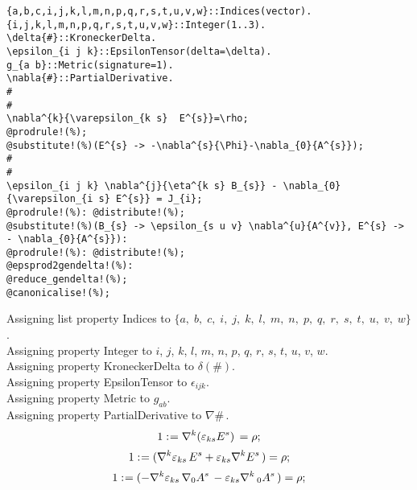 \documentclass[11pt]{article}
\def\specialcolon{\mathrel{\mathop{:}}\hspace{-.5em}}
\begin{document}
{\color[named]{Blue}\begin{verbatim}
{a,b,c,i,j,k,l,m,n,p,q,r,s,t,u,v,w}::Indices(vector).
{i,j,k,l,m,n,p,q,r,s,t,u,v,w}::Integer(1..3).
\delta{#}::KroneckerDelta.
\epsilon_{i j k}::EpsilonTensor(delta=\delta).
g_{a b}::Metric(signature=1).
\nabla{#}::PartialDerivative.
#
#
\nabla^{k}{\varepsilon_{k s}  E^{s}}=\rho;
@prodrule!(%);
@substitute!(%)(E^{s} -> -\nabla^{s}{\Phi}-\nabla_{0}{A^{s}});
#
#
\epsilon_{i j k} \nabla^{j}{\eta^{k s} B_{s}} - \nabla_{0}{\varepsilon_{i s} E^{s}} = J_{i};
@prodrule!(%): @distribute!(%);
@substitute!(%)(B_{s} -> \epsilon_{s u v} \nabla^{u}{A^{v}}, E^{s} -> - \nabla_{0}{A^{s}}):
@prodrule!(%): @distribute!(%);
@epsprod2gendelta!(%):
@reduce_gendelta!(%);
@canonicalise!(%);
\end{verbatim}}
Assigning list property Indices to $\{a,\; b,\; c,\; i,\; j,\; k,\; l,\; m,\; n,\; p,\; q,\; r,\; s,\; t,\; u,\; v,\; w\}$.
\\
Assigning property Integer to $i$, $j$, $k$, $l$, $m$, $n$, $p$, $q$, $r$, $s$, $t$, $u$, $v$, $w$.
\\
Assigning property KroneckerDelta to $\delta(\#)$.
\\
Assigning property EpsilonTensor to ${\epsilon}_{i j k}$.
\\
Assigning property Metric to ${g}_{a b}$.
\\
Assigning property PartialDerivative to $\nabla{\#}\, $.
\\
\begin{dmath*}[compact, spread=2pt]
1\specialcolon{}= {\nabla}^{k}{({\varepsilon}_{k s} {E}^{s})}\,  = \rho;
\end{dmath*}
\begin{dmath*}[compact, spread=2pt]
1\specialcolon{}= ({\nabla}^{k}{{\varepsilon}_{k s}}\,  {E}^{s} + {\varepsilon}_{k s} {\nabla}^{k}{{E}^{s}}\, ) = \rho;
\end{dmath*}
\begin{dmath*}[compact, spread=2pt]
1\specialcolon{}= ( - {\nabla}^{k}{{\varepsilon}_{k s}}\,  {\nabla}_{0}{{A}^{s}}\,  - {\varepsilon}_{k s} {\nabla}^{k}\,_{0}{{A}^{s}}\, ) = \rho;
\end{dmath*}
\end{document}
